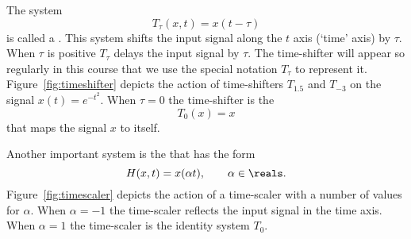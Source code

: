The system
\[
T_\tau(x,t) = x(t - \tau)
\]
is called a .  This system shifts the input signal along the $t$ axis (`time' axis) by $\tau$.  When $\tau$ is positive $T_{\tau}$ delays the input signal by $\tau$.  The time-shifter will appear so regularly in this course that we use the special notation $T_\tau$ to represent it.  Figure~\ref{fig:timeshifter} depicts the action of time-shifters $T_{1.5}$ and $T_{-3}$ on the signal $x(t) = e^{-t^2}$.  When $\tau=0$ the time-shifter is the 
\[
T_0(x) = x
\]
that maps the signal $x$ to itself.

Another important system is the  that has the form
\[
H(x,t) = x(\alpha t), \qquad \alpha \in \reals.
\]
Figure~\ref{fig:timescaler} depicts the action of a time-scaler with a number of values for $\alpha$.  When $\alpha=-1$ the time-scaler reflects the input signal in the time axis.  When $\alpha = 1$ the time-scaler is the identity system $T_0$.



